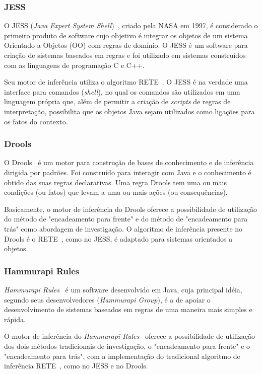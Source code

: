 \subsubsection*{JESS}

O JESS (\textit{Java Expert System Shell})~\citep{friedman2003jess:2003}, criado pela NASA em 1997, é considerado o primeiro produto de software cujo objetivo é integrar os objetos de um sistema Orientado a Objetos (OO) com regras de domínio. O JESS é um software para criação de sistemas baseados em regras e foi utilizado em
sistemas construídos com as linguagens de programação C e C++.

Seu motor de inferência utiliza o algoritmo RETE~\citep{forgy1982rete:1982}. O JESS é
na verdade uma interface para comandos (\textit{shell}), no qual os comandos são utilizados
em uma linguagem própria que, além de permitir a criação de \textit{scripts} de regras de
interpretação, possibilita que os objetos Java sejam utilizados como ligações para os
fatos do contexto.


\subsubsection*{Drools}

O Drools~\citep{Browne:2009} é um motor para construção de bases de conhecimento e de inferência dirigida por padrões. Foi construído para interagir com Java e o conhecimento é obtido das suas regras declarativas. Uma regra Drools tem uma ou mais condições (ou fatos) que levam a uma ou mais ações (ou consequências).

Basicamente, o motor de inferência do Drools oferece a possibilidade de utilização do método de "encadeamento para frente" e do método de "encadeamento para trás" como abordagem de investigação. O algoritmo de inferência presente no Drools é o RETE~\citep{friedman2003jess:2003}, como no JESS, é adaptado para sistemas orientados a objetos.


\subsubsection*{Hammurapi Rules}

\textit{Hammurapi Rules}~\citep{Hammurapi:2012} é um software desenvolvido em Java, cuja principal
idéia, segundo seus desenvolvedores (\textit{Hammurapi Group}), é a de apoiar o
desenvolvimento de sistemas baseados em regras de uma maneira mais simples e
rápida.

O motor de inferência do \textit{Hammurapi Rules}~\citep{Hammurapi:2012} oferece a possibilidade de
utilização dos dois métodos tradicionais de investigação, o "encadeamento para frente" e o "encadeamento para trás", com a implementação do tradicional algoritmo de inferência RETE~\citep{forgy1982rete:1982}, como no JESS e no Drools.

